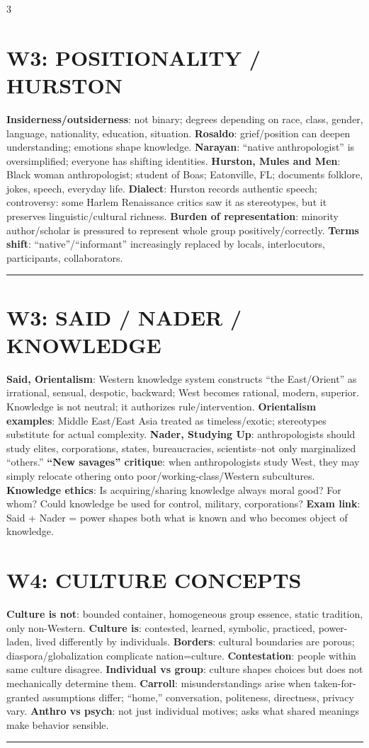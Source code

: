 \documentclass[10pt,landscape]{article}
\newcommand{\kw}[1]{\textbf{#1}}
\newcommand{\sep}{\vspace{0.8pt}\hrule\vspace{0.8pt}}
\begin{document}
\begin{multicols}{3}
\section*{W3: POSITIONALITY / HURSTON}
\kw{Insiderness/outsiderness}: not binary; degrees depending on race, class, gender, language, nationality, education, situation. \kw{Rosaldo}: grief/position can deepen understanding; emotions shape knowledge. \kw{Narayan}: ``native anthropologist'' is oversimplified; everyone has shifting identities. \kw{Hurston, Mules and Men}: Black woman anthropologist; student of Boas; Eatonville, FL; documents folklore, jokes, speech, everyday life. \kw{Dialect}: Hurston records authentic speech; controversy: some Harlem Renaissance critics saw it as stereotypes, but it preserves linguistic/cultural richness. \kw{Burden of representation}: minority author/scholar is pressured to represent whole group positively/correctly. \kw{Terms shift}: ``native''/``informant'' increasingly replaced by locals, interlocutors, participants, collaborators.
\sep
\section*{W3: SAID / NADER / KNOWLEDGE}
\kw{Said, Orientalism}: Western knowledge system constructs ``the East/Orient'' as irrational, sensual, despotic, backward; West becomes rational, modern, superior. Knowledge is not neutral; it authorizes rule/intervention. \kw{Orientalism examples}: Middle East/East Asia treated as timeless/exotic; stereotypes substitute for actual complexity. \kw{Nader, Studying Up}: anthropologists should study elites, corporations, states, bureaucracies, scientists--not only marginalized ``others.'' \kw{``New savages'' critique}: when anthropologists study West, they may simply relocate othering onto poor/working-class/Western subcultures. \kw{Knowledge ethics}: Is acquiring/sharing knowledge always moral good? For whom? Could knowledge be used for control, military, corporations? \kw{Exam link}: Said + Nader = power shapes both what is known and who becomes object of knowledge.

\section*{W4: CULTURE CONCEPTS}
\kw{Culture is not}: bounded container, homogeneous group essence, static tradition, only non-Western. \kw{Culture is}: contested, learned, symbolic, practiced, power-laden, lived differently by individuals. \kw{Borders}: cultural boundaries are porous; diaspora/globalization complicate nation=culture. \kw{Contestation}: people within same culture disagree. \kw{Individual vs group}: culture shapes choices but does not mechanically determine them. \kw{Carroll}: misunderstandings arise when taken-for-granted assumptions differ; ``home,'' conversation, politeness, directness, privacy vary. \kw{Anthro vs psych}: not just individual motives; asks what shared meanings make behavior sensible.
\sep

\end{multicols}
\end{document}
